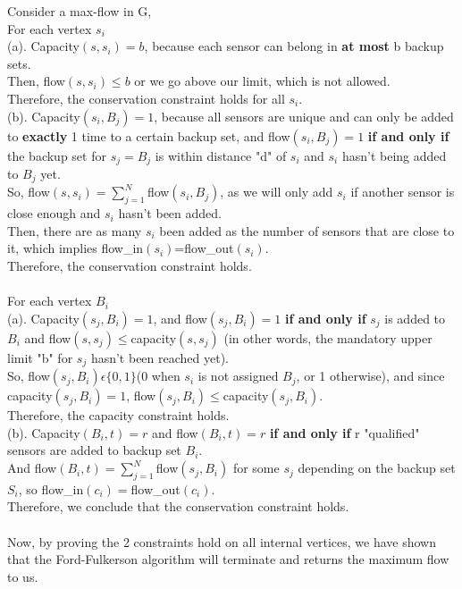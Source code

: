 \documentclass{assignment-373}
\begin{document}
\begin{enumerate}
    \phantom{=} \phantom{=} Consider a max-flow in G,\\
    \phantom{=} \phantom{=} For each vertex $s_i$\\
    \phantom{=} \phantom{=} \phantom{=} (a). Capacity$(s,s_i)=b$, because each sensor can belong in \textbf{at most} b backup sets.\\
    \phantom{=} \phantom{=} \phantom{=} Then, flow$(s,s_i)\leq b$ or we go above our limit, which is not allowed.\\
    \phantom{=} \phantom{=} \phantom{=} Therefore, the conservation constraint holds for all $s_i$.\\
    \phantom{=} \phantom{=} \phantom{=} (b). Capacity$(s_i,B_j)=1$, because all sensors are unique and can only be added to \textbf{exactly} 1 time to a certain backup set, and flow$(s_i,B_j)=1$ \textbf{if and only if} the backup set for $s_j = B_j$ is within distance "d" of $s_i$ and $s_i$ hasn't being added to $B_j$ yet.\\
    \phantom{=} \phantom{=} \phantom{=} So, flow$(s,s_i)=\sum_{j=1}^{N}$flow$(s_i,B_j)$, as we will only add $s_i$ if another sensor is close enough and $s_i$ hasn't been added.\\
    \phantom{=} \phantom{=} \phantom{=} Then, there are as many $s_i$ been added as the number of sensors that are close to it, which implies flow\_in$(s_i)$=flow\_out$(s_i)$.\\
    \phantom{=} \phantom{=} \phantom{=} Therefore, the conservation constraint holds.\\
    \\
    \phantom{=} \phantom{=} For each vertex $B_i$\\
    \phantom{=} \phantom{=} \phantom{=} (a). Capacity$(s_j,B_i)=1$, and flow$(s_j,B_i)=1$ \textbf{if and only if} $s_j$ is added to $B_i$ and flow$(s,s_j)\leq$capacity$(s,s_j)$ (in other words, the mandatory upper limit "b" for $s_j$ hasn't been reached yet).\\
    \phantom{=} \phantom{=} \phantom{=} So, flow$(s_j,B_i)\epsilon\{0,1\}$(0 when $s_i$ is not assigned $B_j$, or 1 otherwise), and since capacity$(s_j,B_i)=1$, flow$(s_j,B_i)\leq$capacity$(s_j,B_i)$.\\
    \phantom{=} \phantom{=} \phantom{=} Therefore, the capacity constraint holds.\\
    \phantom{=} \phantom{=} \phantom{=} (b). Capacity$(B_i,t)=r$ and flow$(B_i,t)=r$ \textbf{if and only if} r "qualified" sensors are added to backup set $B_i$.\\
    \phantom{=} \phantom{=} \phantom{=} And flow$(B_i,t)=\sum_{j=1}^{N}$flow$(s_j,B_i)$ for some $s_j$ depending on the backup set $S_i$, so flow\_in$(c_i)=$flow\_out$(c_i)$.\\
    \phantom{=} \phantom{=} \phantom{=} Therefore, we conclude that the conservation constraint holds.\\
    \\
    Now, by proving the 2 constraints hold on all internal vertices, we have shown that the Ford-Fulkerson algorithm will terminate and returns the maximum flow to us.\\
    

\end{enumerate}
\end{document}
